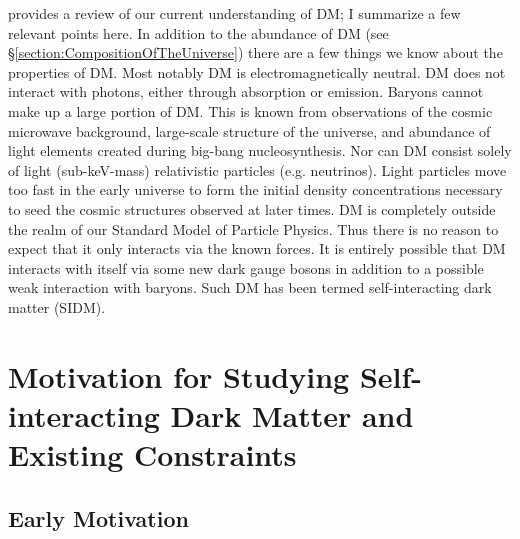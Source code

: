 \citet{Peter:2012tg} provides a review of our current understanding of DM;  I summarize a few relevant points here.
In addition to the abundance of DM (see \S \ref{section:CompositionOfTheUniverse}) there are a few things we know about the properties of DM.
Most notably DM is electromagnetically neutral.
DM does not interact with photons, either through absorption or emission.
Baryons cannot make up a large portion of DM.
This is known from observations of the cosmic microwave background, large-scale structure of the universe, and abundance of light elements created during big-bang nucleosynthesis.
Nor can DM consist solely of light (sub-keV-mass) relativistic particles (e.g. neutrinos). 
Light particles move too fast in the early universe to form the initial density concentrations necessary to seed the cosmic structures observed at later times.
DM is completely outside the realm of our Standard Model of Particle Physics.
Thus there is no reason to expect that it only interacts via the known forces.
It is entirely possible that DM interacts with itself via some new dark gauge bosons in addition to a possible weak interaction with baryons.
Such DM has been termed self-interacting dark matter (SIDM).

\section{Motivation for Studying Self-interacting Dark Matter and Existing Constraints}\label{section:SIDMmotivation}

\subsection{Early Motivation}

